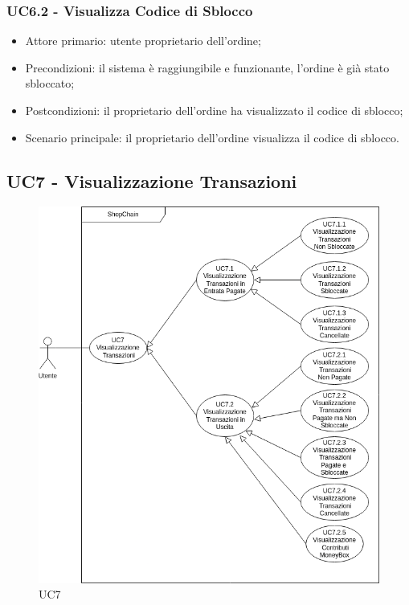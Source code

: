 \subsubsection{UC6.2 - Visualizza Codice di Sblocco}

\begin{itemize}
    \item Attore primario: utente proprietario dell'ordine;
    \item Precondizioni: il sistema è raggiungibile e funzionante, l'ordine è già stato sbloccato;
    \item Postcondizioni: il proprietario dell'ordine ha visualizzato il codice di sblocco;
    \item Scenario principale: il proprietario dell'ordine visualizza il codice di sblocco.
\end{itemize}

\subsection{UC7 - Visualizzazione Transazioni}\label{subsection: U7}

\begin{figure}[H]
    \centering
    \includegraphics[scale=0.7]{immagini/UC7.png}
    \caption{UC7}
\end{figure}

